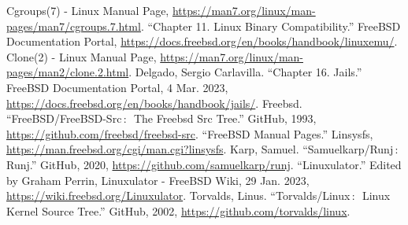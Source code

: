 \documentclass[12pt, dvipsnames, a4paper]{article}
\begin{document}
\begin{thebibliography}{00}
	 Cgroups(7) - Linux Manual Page, \href{https://man7.org/linux/man-pages/man7/cgroups.7.html}{https://man7.org/linux/man-pages/man7/cgroups.7.html}.
	 “Chapter 11. Linux Binary Compatibility.” FreeBSD Documentation Portal, \href{https://docs.freebsd.org/en/books/handbook/linuxemu/}{https://docs.freebsd.org/en/books/handbook/linuxemu/}.
	 Clone(2) - Linux Manual Page, \href{https://man7.org/linux/man-pages/man2/clone.2.html}{https://man7.org/linux/man-pages/man2/clone.2.html}.
	 Delgado, Sergio  Carlavilla. “Chapter 16. Jails.” FreeBSD Documentation Portal, 4 Mar. 2023, \href{https://docs.freebsd.org/en/books/handbook/jails/}{https://docs.freebsd.org/en/books/handbook/jails/}.
	 Freebsd. “FreeBSD/FreeBSD-Src$\,\colon\,$ The Freebsd Src Tree.” GitHub, 1993, \href{https://github.com/freebsd/freebsd-src}{https://github.com/freebsd/freebsd-src}.
	 “FreeBSD Manual Pages.” Linsysfs, \href{https://man.freebsd.org/cgi/man.cgi?linsysfs}{https://man.freebsd.org/cgi/man.cgi?linsysfs}.
	 Karp, Samuel. “Samuelkarp/Runj$\,\colon\,$ Runj.” GitHub, 2020, \href{https://github.com/samuelkarp/runj}{https://github.com/samuelkarp/runj}.
	 “Linuxulator.” Edited by Graham Perrin, Linuxulator - FreeBSD Wiki, 29 Jan. 2023, \href{https://wiki.freebsd.org/Linuxulator}{https://wiki.freebsd.org/Linuxulator}.
	 Torvalds, Linus. “Torvalds/Linux$\,\colon\,$ Linux Kernel Source Tree.” GitHub, 2002, \href{https://github.com/torvalds/linux}{https://github.com/torvalds/linux}.



\end{thebibliography}
\end{document}
